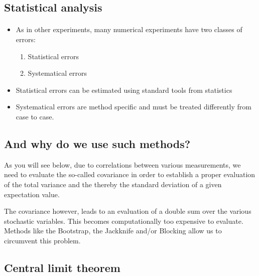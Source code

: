 \documentclass[%
oneside,                 %
final,                   %
10pt]{article}
\begin{document}
\noindent

    

\subsection*{Statistical analysis}

\paragraph{}
\begin{itemize}
\item As in other experiments, many numerical  experiments have two classes of errors:
\begin{enumerate}

\item Statistical errors

\item Systematical errors

\end{enumerate}

\noindent
\item Statistical errors can be estimated using standard tools from statistics

\item Systematical errors are method specific and must be treated differently from case to case. 
\end{itemize}

\noindent

    

\subsection*{And why do we use such methods?}

As you will see below, due to correlations between various
measurements, we need to evaluate the so-called covariance in order to
establish a proper evaluation of the total variance and the thereby
the standard deviation of a given expectation value.

The covariance however, leads to an evaluation of a double sum over the various stochastic variables. This becomes computationally too expensive to evaluate.
Methods like the Bootstrap, the Jackknife and/or Blocking allow us to circumvent this problem. 

\subsection*{Central limit theorem}
\end{document}
